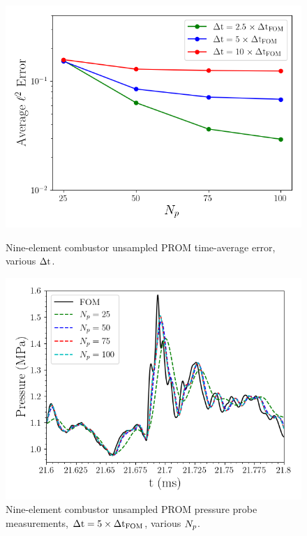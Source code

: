 \begin{figure}
	\begin{minipage}{0.49\linewidth}
		\includegraphics[width=0.99\linewidth]{Chapters/HPROMResults/Images/nineElem/unsampled/unsampled_avg_mode_Average_errorRaw.png}
		\caption{\label{fig:nineElemUnsampledError}Nine-element combustor unsampled PROM time-average error, various $\Delta \text{t}$.}
	\end{minipage}
	\begin{minipage}{0.49\linewidth}
		\includegraphics[width=0.99\linewidth]{Chapters/HPROMResults/Images/nineElem/unsampled/pressure_probe_unsampled_modes.png}
		\caption{\label{fig:nineElemUnsampledProbe}Nine-element combustor unsampled PROM pressure probe measurements, $\Delta \text{t} = 5 \times \Delta \text{t}_{\text{FOM}}$, various $N_p$.}
	\end{minipage}
\end{figure}

